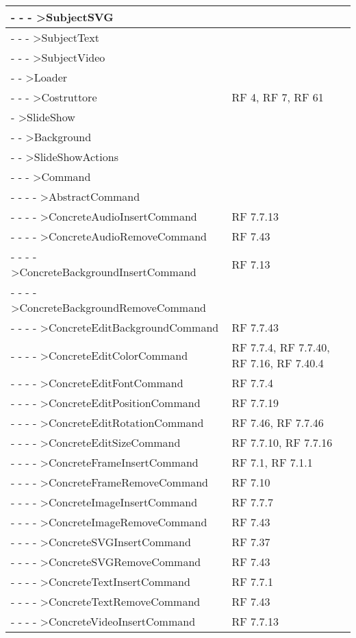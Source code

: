 {\begin{longtable} [c]{| p{8cm} | p{5cm} |}
 \hline 
- - - >SubjectSVG & \\ 
 \hline 
- - - >SubjectText & \\ 
 \hline 
- - - >SubjectVideo & \\ 
 \hline 
- - >Loader & \\ 
 \hline 
- - - >Costruttore & RF 4, RF 7, RF 61\\ 
 \hline 
- >SlideShow & \\ 
 \hline 
- - >Background & \\ 
 \hline 
- - >SlideShowActions & \\ 
 \hline 
- - - >Command & \\ 
 \hline 
- - - - >AbstractCommand & \\ 
 \hline 
- - - - >ConcreteAudioInsertCommand & RF 7.7.13\\ 
 \hline 
- - - - >ConcreteAudioRemoveCommand & RF 7.43\\ 
 \hline 
- - - - >ConcreteBackgroundInsertCommand & RF 7.13\\ 
 \hline 
- - - - >ConcreteBackgroundRemoveCommand & \\ 
 \hline 
- - - - >ConcreteEditBackgroundCommand & RF 7.7.43\\ 
 \hline 
- - - - >ConcreteEditColorCommand & RF 7.7.4, RF 7.7.40, RF 7.16, RF 7.40.4\\ 
 \hline 
- - - - >ConcreteEditFontCommand & RF 7.7.4\\ 
 \hline 
- - - - >ConcreteEditPositionCommand & RF 7.7.19\\ 
 \hline 
- - - - >ConcreteEditRotationCommand & RF 7.46, RF 7.7.46\\ 
 \hline 
- - - - >ConcreteEditSizeCommand & RF 7.7.10, RF 7.7.16\\ 
 \hline 
- - - - >ConcreteFrameInsertCommand & RF 7.1, RF 7.1.1\\ 
 \hline 
- - - - >ConcreteFrameRemoveCommand & RF 7.10\\ 
 \hline 
- - - - >ConcreteImageInsertCommand & RF 7.7.7\\ 
 \hline 
- - - - >ConcreteImageRemoveCommand & RF 7.43\\ 
 \hline 
- - - - >ConcreteSVGInsertCommand & RF 7.37\\ 
 \hline 
- - - - >ConcreteSVGRemoveCommand & RF 7.43\\ 
 \hline 
- - - - >ConcreteTextInsertCommand & RF 7.7.1\\ 
 \hline 
- - - - >ConcreteTextRemoveCommand & RF 7.43\\ 
 \hline 
- - - - >ConcreteVideoInsertCommand & RF 7.7.13\\ 

\end{longtable}}
